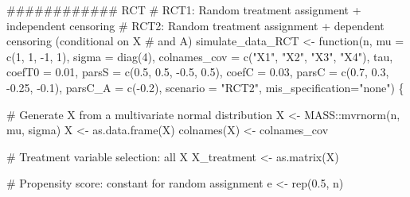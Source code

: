\documentclass[
  11pt,
  a4paper,
]{article}
\newenvironment{Shaded}{}{}
\newcommand{\AttributeTok}[1]{\textcolor[rgb]{0.84,0.23,0.29}{#1}}
\newcommand{\CommentTok}[1]{\textcolor[rgb]{0.42,0.45,0.49}{#1}}
\newcommand{\ControlFlowTok}[1]{\textcolor[rgb]{0.84,0.23,0.29}{#1}}
\newcommand{\DecValTok}[1]{\textcolor[rgb]{0.00,0.36,0.77}{#1}}
\newcommand{\DocumentationTok}[1]{\textcolor[rgb]{0.42,0.45,0.49}{#1}}
\newcommand{\FloatTok}[1]{\textcolor[rgb]{0.00,0.36,0.77}{#1}}
\newcommand{\FunctionTok}[1]{\textcolor[rgb]{0.44,0.26,0.76}{#1}}
\newcommand{\NormalTok}[1]{\textcolor[rgb]{0.14,0.16,0.18}{#1}}
\newcommand{\OtherTok}[1]{\textcolor[rgb]{0.44,0.26,0.76}{#1}}
\newcommand{\SpecialCharTok}[1]{\textcolor[rgb]{0.00,0.36,0.77}{#1}}
\newcommand{\StringTok}[1]{\textcolor[rgb]{0.01,0.18,0.38}{#1}}
\theoremstyle{plain}
\theoremstyle{plain}
\theoremstyle{plain}
\theoremstyle{definition}
\theoremstyle{remark}
\begin{document}
\begin{Shaded}
\begin{Highlighting}[]
\DocumentationTok{\#\#\#\#\#\#\#\#\#\#\#\# RCT }
\CommentTok{\# RCT1:  Random treatment assignment + independent censoring}
\CommentTok{\# RCT2:  Random treatment assignment + dependent censoring (conditional on X }
\CommentTok{\# and A)}
\NormalTok{simulate\_data\_RCT }\OtherTok{\textless{}{-}} \ControlFlowTok{function}\NormalTok{(n, }\AttributeTok{mu =} \FunctionTok{c}\NormalTok{(}\DecValTok{1}\NormalTok{, }\DecValTok{1}\NormalTok{, }\SpecialCharTok{{-}}\DecValTok{1}\NormalTok{, }\DecValTok{1}\NormalTok{), }
                              \AttributeTok{sigma =} \FunctionTok{diag}\NormalTok{(}\DecValTok{4}\NormalTok{), }
                              \AttributeTok{colnames\_cov =} \FunctionTok{c}\NormalTok{(}\StringTok{"X1"}\NormalTok{, }\StringTok{"X2"}\NormalTok{, }\StringTok{"X3"}\NormalTok{, }\StringTok{"X4"}\NormalTok{),}
\NormalTok{                              tau, }
                              \AttributeTok{coefT0 =} \FloatTok{0.01}\NormalTok{,}
                              \AttributeTok{parsS =} \FunctionTok{c}\NormalTok{(}\FloatTok{0.5}\NormalTok{, }\FloatTok{0.5}\NormalTok{, }\SpecialCharTok{{-}}\FloatTok{0.5}\NormalTok{, }\FloatTok{0.5}\NormalTok{), }
                              \AttributeTok{coefC =} \FloatTok{0.03}\NormalTok{,}
                              \AttributeTok{parsC =} \FunctionTok{c}\NormalTok{(}\FloatTok{0.7}\NormalTok{, }\FloatTok{0.3}\NormalTok{, }\SpecialCharTok{{-}}\FloatTok{0.25}\NormalTok{, }\SpecialCharTok{{-}}\FloatTok{0.1}\NormalTok{), }
                              \AttributeTok{parsC\_A =} \FunctionTok{c}\NormalTok{(}\SpecialCharTok{{-}}\FloatTok{0.2}\NormalTok{), }
                              \AttributeTok{scenario =} \StringTok{"RCT2"}\NormalTok{,}
                              \AttributeTok{mis\_specification=}\StringTok{"none"}\NormalTok{) \{}
  
  \CommentTok{\# Generate X from a multivariate normal distribution}
\NormalTok{  X }\OtherTok{\textless{}{-}}\NormalTok{ MASS}\SpecialCharTok{::}\FunctionTok{mvrnorm}\NormalTok{(n, mu, sigma)}
\NormalTok{  X }\OtherTok{\textless{}{-}} \FunctionTok{as.data.frame}\NormalTok{(X)}
  \FunctionTok{colnames}\NormalTok{(X) }\OtherTok{\textless{}{-}}\NormalTok{ colnames\_cov}
  
  \CommentTok{\# Treatment variable selection: all X}
\NormalTok{  X\_treatment }\OtherTok{\textless{}{-}} \FunctionTok{as.matrix}\NormalTok{(X)}
  
  \CommentTok{\# Propensity score: constant for random assignment}
\NormalTok{  e }\OtherTok{\textless{}{-}} \FunctionTok{rep}\NormalTok{(}\FloatTok{0.5}\NormalTok{, n)}
  

\end{Highlighting}
\end{Shaded}
\end{document}
